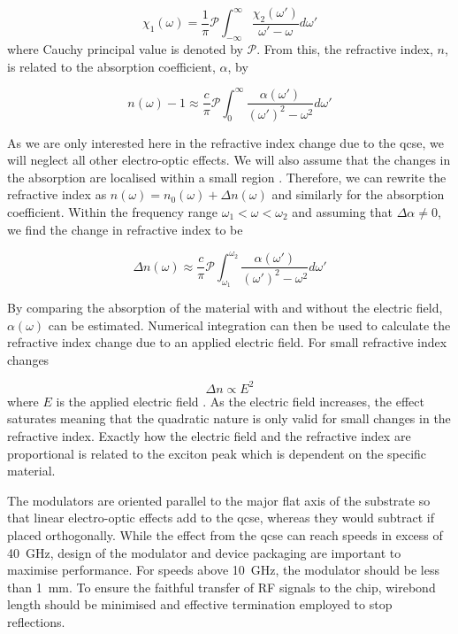 \begin{equation}
	\chi_1(\omega) = \frac{1}{\pi} \mathcal{P} \int_{-\infty}^{\infty} \frac{\chi_2(\omega')}{\omega' - \omega} d\omega'
\end{equation}
where Cauchy principal value is denoted by $\mathcal{P}$. From this, the refractive index, $n$, is related to the absorption coefficient, $\alpha$, by \cite{Hutchings1992}

\begin{equation}
	n(\omega) - 1 \approx \frac{c}{\pi}\mathcal{P}\int_0^\infty \frac{\alpha(\omega')}{(\omega')^2 - \omega^2} d\omega'
\end{equation}

As we are only interested here in the refractive index change due to the \ac{qcse}, we will neglect all other electro-optic effects. We will also assume that the changes in the absorption are localised within a small region \cite{weiner1987}. Therefore, we can rewrite the refractive index as $n(\omega) = n_0(\omega) + \Delta n (\omega)$ and similarly for the absorption coefficient. Within the frequency range $\omega_1 < \omega < \omega_2$ and assuming that $\Delta \alpha \ne 0$, we find the change in refractive index to be

\begin{equation}
	\Delta n(\omega) \approx \frac{c}{\pi}\mathcal{P}\int_{\omega_1}^{\omega_2} \frac{\alpha(\omega')}{(\omega')^2 - \omega^2} d\omega'
\end{equation}

By comparing the absorption of the material with and without the electric field, $\alpha(\omega)$ can be estimated. Numerical integration can then be used to calculate the refractive index change due to an applied electric field. For small refractive index changes

\begin{equation}
	\Delta n \propto E^2
\end{equation}
where $E$ is the applied electric field \cite{qcse}. As the electric field increases, the effect saturates meaning that the quadratic nature is only valid for small changes in the refractive index. Exactly how the electric field and the refractive index are proportional is related to the exciton peak which is dependent on the specific material. 

The modulators are oriented parallel to the major flat axis of the substrate so that linear electro-optic effects add to the \ac{qcse}, whereas they would subtract if placed orthogonally. While the effect from the \ac{qcse} can reach speeds in excess of \SI{40}{GHz}, design of the modulator and device packaging are important to maximise performance. For speeds above \SI{10}{GHz}, the modulator should be less than \SI{1}{mm}. To ensure the faithful transfer of RF signals to the chip, wirebond length should be minimised and effective termination employed to stop reflections.

